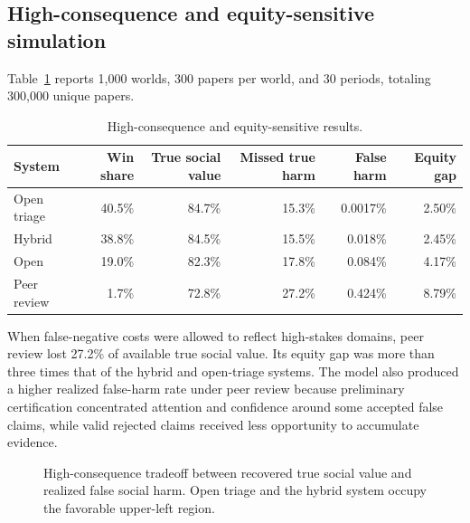 \subsection{High-consequence and equity-sensitive simulation}

Table~\ref{tab:harm} reports 1,000 worlds, 300 papers per world, and 30 periods, totaling 300,000 unique papers.

\begin{table}[ht]
\centering
\caption{High-consequence and equity-sensitive results.}
\label{tab:harm}
\small
\begin{tabular}{lrrrrr}
\toprule
System & Win share & True social value & Missed true harm & False harm & Equity gap\\
\midrule
Open triage & 40.5\% & 84.7\% & 15.3\% & 0.0017\% & 2.50\%\\
Hybrid & 38.8\% & 84.5\% & 15.5\% & 0.018\% & 2.45\%\\
Open & 19.0\% & 82.3\% & 17.8\% & 0.084\% & 4.17\%\\
Peer review & 1.7\% & 72.8\% & 27.2\% & 0.424\% & 8.79\%\\
\bottomrule
\end{tabular}
\end{table}

When false-negative costs were allowed to reflect high-stakes domains, peer review lost 27.2\% of available true social value. Its equity gap was more than three times that of the hybrid and open-triage systems. The model also produced a higher realized false-harm rate under peer review because preliminary certification concentrated attention and confidence around some accepted false claims, while valid rejected claims received less opportunity to accumulate evidence.


\begin{figure}[ht]
\centering
{}
\caption{High-consequence tradeoff between recovered true social value and realized false social harm. Open triage and the hybrid system occupy the favorable upper-left region.}
\label{fig:highconsequence_tradeoff}
\end{figure}
